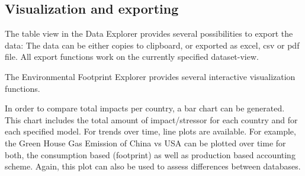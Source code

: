 \subsection{Visualization and exporting}

The table view in the Data Explorer provides several possibilities to export the data: The data can be either copies to clipboard, or exported as excel, csv or pdf file. All export functions work on the currently specified dataset-view. 

The Environmental Footprint Explorer provides several interactive visualization functions. 

In order to compare total impacts per country, a bar chart can be generated. This chart includes the total amount of impact/stressor for each country and for each specified model. For trends over time, line plots are available. 
For example, the Green House Gas Emission of China vs USA can be plotted over time for both, the consumption based (footprint) as well as production based accounting scheme. Again, this plot can also be used to assess differences between databases.


